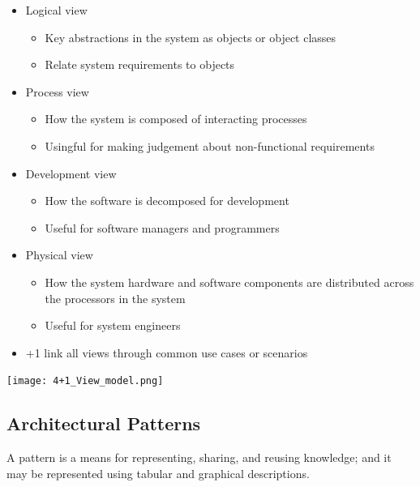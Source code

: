 \documentclass{article}
\begin{document}
    \begin{itemize}
        \item Logical view 
        \begin{itemize}
            \item Key abstractions in the system as objects or object classes
            \item Relate system requirements to objects
        \end{itemize}
        \item Process view 
        \begin{itemize}
            \item How the system is composed of interacting processes
            \item Usingful for making judgement about non-functional requirements 
        \end{itemize}
        \item Development view 
        \begin{itemize}
            \item How the software is decomposed for development 
            \item Useful for software managers and programmers 
        \end{itemize}
        \item Physical view 
        \begin{itemize}
            \item How the system hardware and software components are distributed across 
            the processors in the system 
            \item Useful for system engineers 
        \end{itemize}
        \item +1 link all views through common use cases or scenarios 
    \end{itemize}

    \begin{center}
        \texttt{[image: 4+1\_View\_model.png]}
    \end{center}

    \subsection*{Architectural Patterns}

    A pattern is a means for representing, sharing, and reusing knowledge; and it may be 
    represented using tabular and graphical descriptions.
\end{document}
